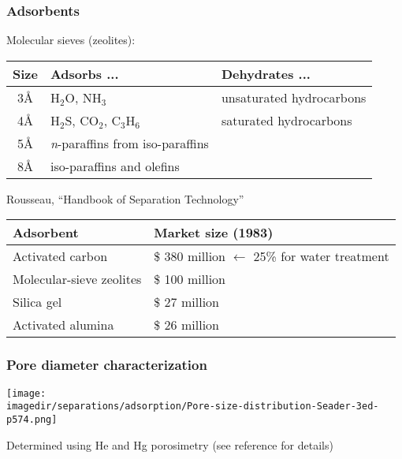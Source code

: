 \begin{frame}\frametitle{Adsorbents}
	Molecular sieves (zeolites):

	\begin{tabular}{cll}\\
		\textbf{Size}	&	\textbf{Adsorbs} ... 					&	\textbf{Dehydrates} ...\vspace{6pt}\\ \hline
		3\AA			&	$\text{H}_2\text{O}$, $\text{NH}_3$		& 	unsaturated hydrocarbons\\
		4\AA			&  	$\text{H}_2\text{S}$, $\text{CO}_2$, $\text{C}_3\text{H}_6$		& 	saturated hydrocarbons\\
		5\AA			&	\emph{n}-paraffins from iso-paraffins   & \\
		8\AA			& 	iso-paraffins and olefins				&	\\
	\end{tabular}
	\vspace{12pt}

	\vspace{12pt}
	Rousseau, ``Handbook of Separation Technology''

	\begin{tabular}{ll}\\
		\textbf{Adsorbent}				&	\textbf{Market size (1983)} \vspace{6pt}\\ \hline
			Activated carbon 			&	\$ 380 million $\longleftarrow$ 25\% for water treatment \\
			Molecular-sieve zeolites 	&	\$ 100 million  \\
			Silica gel					&	\$ 27 million  \\
			Activated alumina			&	\$ 26 million
	\end{tabular}
\end{frame}

\begin{frame}\frametitle{Pore diameter characterization}
	\begin{center}
		\texttt{[image: \\imagedir/separations/adsorption/Pore-size-distribution-Seader-3ed-p574.png]}
	\end{center}
	{\scriptsize Determined using He and Hg porosimetry (see reference for details)}
\end{frame}

